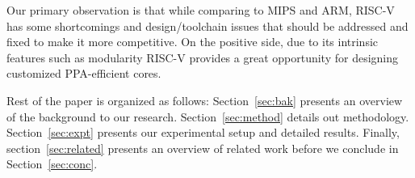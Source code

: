 Our primary observation is that while comparing to MIPS and ARM, RISC-V has some shortcomings and design/toolchain issues that should be addressed and fixed to make it more competitive. On the positive side, due to its intrinsic features such as modularity RISC-V provides a great opportunity for designing customized PPA-efficient cores. 

Rest of the paper is organized as follows: Section~\ref{sec:bak} presents an overview of the background to our research. Section~\ref{sec:method} details out methodology. Section~\ref{sec:expt} presents our experimental setup and detailed results. Finally, section~\ref{sec:related} presents an overview of related work before we conclude in Section~\ref{sec:conc}.



